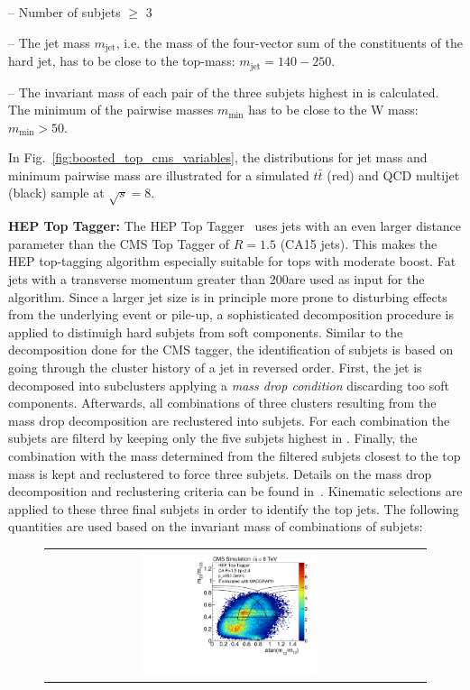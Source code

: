 \begin{description}
\begin{description}
 \item -- Number of subjets $\ge$ 3
 \item -- The jet mass $m_{\mathrm{jet}}$, i.e. the mass of the four-vector sum of the constituents of the hard jet, has to be close to the top-mass: $m_{\mathrm{jet}} = 140-250$\gev.
 \item -- The invariant mass of each pair of the three subjets highest in \pt is calculated. The minimum of the pairwise masses $m_{\mathrm{min}}$ has to be close to the W mass: $m_{\mathrm{min}} > 50$\gev.
\end{description}
In Fig.~\ref{fig:boosted_top_cms_variables}, the distributions for jet mass and minimum pairwise mass are illustrated for a simulated $t\bar{t}$ (red) and QCD multijet (black) sample at $\sqrt{s} = 8$\tev. 
 \item \textbf{HEP Top Tagger:} The HEP Top Tagger~\cite{Plehn:2010st} uses jets with an even larger distance parameter than the CMS Top Tagger of $R = 1.5$ (CA15 jets). This makes the HEP top-tagging algorithm especially suitable for tops with moderate boost. Fat jets with a transverse momentum greater than 200\gev are used as input for the algorithm. Since a larger jet size is in principle more prone to disturbing effects from the underlying event or pile-up, a sophisticated decomposition procedure is applied to distinuigh hard subjets from soft components. Similar to the decomposition done for the CMS tagger, the identification of subjets is based on going through the cluster history of a jet in reversed order. First, the jet is decomposed into subclusters applying a \textit{mass drop condition} discarding too soft components. Afterwards, all combinations of three clusters resulting from the mass drop decomposition are reclustered into subjets. For each combination the subjets are filterd by keeping only the five subjets highest in \pt. Finally, the combination with the mass determined from the filtered subjets closest to the top mass is kept and reclustered to force three subjets. Details on the mass drop decomposition and reclustering criteria can be found in~\cite{CMS:2014fya}. Kinematic selections are applied to these three final subjets in order to identify the top jets. The following quantities are used based on the invariant mass of combinations of subjets:
\begin{figure}[!tp]
  \centering 
  \begin{tabular}{cc}
    \includegraphics[width=0.49\textwidth]{figures/Pheno2DPlot_HTT2D_NOheptoptag_NOmasscut_hists_Signal_Add.pdf} & 

\end{tabular}
\end{figure}
\end{description}

